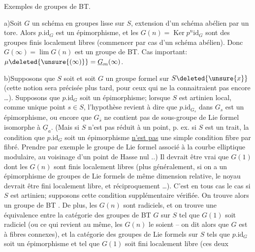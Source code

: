 
Exemples de groupes de BT.

a)\quad Soit $G$ un schéma en groupes lisse sur $S$,  extension d'un schéma abélien par un tore. Alors $p.\mathrm{id}_G$ est un épimorphisme, et les $G(n)=\operatorname{Ker}p^n\mathrm{id}_G$ sont des groupes finis localement libres (commencer par cas d'un schéma abélien). Donc $G(\infty)=\lim G(n)$ est un groupe de BT. Cas important: $\mu\deleted{\unsure{(\infty)}}=\underline{G}_m(\infty)$.

b)\quad Supposons que $S$ soit  et soit $G$ un groupe formel sur $S\deleted{\unsure{x}}$ (cette notion sera précisée plus tard, pour ceux qui ne la connaitraient pas encore \ldots). Supposons que $p.\mathrm{id}_G$ soit un épimorphisme; lorsque $S$ est artinien local, comme unique point $s\in S$, l'hypothèse revient à dire que $p.\mathrm{id}_{G_s}$ dans $G_s$ est un épimorphisme, ou encore que $G_{\bar{s}}$ ne contient pas de sous-groupe de Lie formel isomorphe à $\underline{G}_a$. (Mais si $S$ n'est pas réduit à un point, p. ex. si $S$ est un trait, la condition que $p.\mathrm{id}_G$ soit un épimorphisme \uline{n'est pas} une simple condition fibre par fibré. Prendre par exemple le groupe de Lie formel associé à la courbe elliptique modulaire, au voisinage d'un point de Hasse nul ..\inserted{$(\unsure{\dagger|*})$}) Il devrait être vrai que  $G(1)$ dont les $G(n)$ sont finis localement libres (plus généralement, si on a un épimorphisme de groupes de Lie formels de même dimension relative, le noyau devrait être fini localement libre, et réciproquement \ldots). C'est en tous cas le cas si $S$ est artinien; supposons cette condition supplémentaire vérifiée. On trouve alors un groupe de BT . De plus, les $G(n)$ sont radiciels, et on trouve une équivalence entre la catégorie des groupes de BT $G$ sur $S$ tel que $G(1)$ soit radiciel (ou ce qui revient au même, les $G(n)$ le soient -- on dit alors que $G$ est à fibres connexes), et la catégorie des groupes de Lie formels sur $S$ tels que $p.\mathrm{id}_G$ soit un épimorphisme et tel que $G(1)$ soit fini localement libre (ces deux

